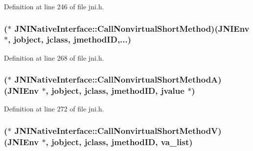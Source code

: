 Definition at line 246 of file jni.\-h.

\hypertarget{struct_j_n_i_native_interface_ac66dc65fb11f349b28c2261271915a6b}{
\subsubsection[{Call\-Nonvirtual\-Short\-Method}]{($\ast$ J\-N\-I\-Native\-Interface\-::\-Call\-Nonvirtual\-Short\-Method)({\bf J\-N\-I\-Env} $\ast$, {\bf jobject}, {\bf jclass}, {\bf jmethod\-I\-D},...)}}\label{struct_j_n_i_native_interface_ac66dc65fb11f349b28c2261271915a6b}


Definition at line 268 of file jni.\-h.

\hypertarget{struct_j_n_i_native_interface_a83cc3f7e136a11a9ad6b6cc602818c77}{
\subsubsection[{Call\-Nonvirtual\-Short\-Method\-A}]{($\ast$ J\-N\-I\-Native\-Interface\-::\-Call\-Nonvirtual\-Short\-Method\-A)({\bf J\-N\-I\-Env} $\ast$, {\bf jobject}, {\bf jclass}, {\bf jmethod\-I\-D}, {\bf jvalue} $\ast$)}}\label{struct_j_n_i_native_interface_a83cc3f7e136a11a9ad6b6cc602818c77}


Definition at line 272 of file jni.\-h.

\hypertarget{struct_j_n_i_native_interface_a17f85413023fb77f189ad0788564a9d1}{
\subsubsection[{Call\-Nonvirtual\-Short\-Method\-V}]{($\ast$ J\-N\-I\-Native\-Interface\-::\-Call\-Nonvirtual\-Short\-Method\-V)({\bf J\-N\-I\-Env} $\ast$, {\bf jobject}, {\bf jclass}, {\bf jmethod\-I\-D}, va\-\_\-list)}}\label{struct_j_n_i_native_interface_a17f85413023fb77f189ad0788564a9d1}


